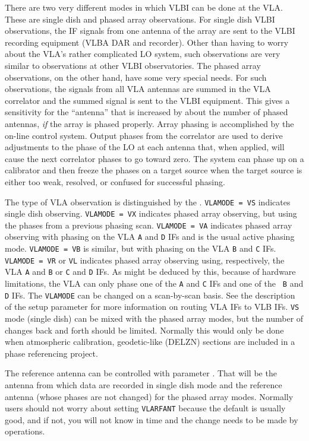 \documentclass{report}
\begin{document}
There are two very different modes in which VLBI can be done at the
VLA.  These are single dish and phased array observations.  For single
dish VLBI observations, the IF signals from one antenna of the array
are sent to the VLBI recording equipment (VLBA DAR and recorder).
Other than having to worry about the VLA's rather complicated LO
system, such observations are very similar to observations at other
VLBI observatories.  The phased array observations, on the other hand,
have some very special needs.  For such observations, the signals from
all VLA antennas are summed in the VLA correlator and the summed
signal is sent to the VLBI equipment.  This gives a sensitivity for
the ``antenna'' that is increased by about the number of phased
antennas, {\em if} the array is phased properly.  Array phasing is
accomplished by the on-line control system.  Output phases from the
correlator are used to derive adjustments to the phase of the LO at
each antenna that, when applied, will cause the next correlator phases
to go toward zero.  The system can phase up on a calibrator and then
freeze the phases on a target source when the target source is either
too weak, resolved, or confused for successful phasing.

The type of VLA observation is distinguished by the .  {\tt VLAMODE = VS} indicates single dish
observing.  {\tt VLAMODE = VX} indicates phased array observing, but
using the phases from a previous phasing scan.  {\tt VLAMODE = VA}
indicates phased array observing with phasing on the VLA {\tt A} and
{\tt D} IFs and is the usual active phasing mode.  {\tt VLAMODE = VB}
is similar, but with phasing on the VLA {\tt B} and {\tt C} IFs.  {\tt
VLAMODE = VR} or {\tt VL} indicates phased array observing using,
respectively, the VLA {\tt A} and {\tt B} or {\tt C} and {\tt D} IFs.
As might be deduced by this, because of hardware limitations, the VLA
can only phase one of the {\tt A} and {\tt C} IFs and one of the {\tt
B} and {\tt D} IFs.  The {\tt VLAMODE} can be changed on a
scan-by-scan basis.  See the description of the setup parameter
 for more information on routing VLA
IFs to VLB IFs.  {\tt VS} mode (single dish) can be mixed with the
phased array modes, but the number of changes back and forth should be
limited.  Normally this would only be done when atmospheric
calibration, geodetic-like (DELZN) sections are included in a phase
referencing project.

The reference antenna can be controlled with parameter .  That will be the antenna from which data are
recorded in single dish mode and the reference antenna (whose phases
are not changed) for the phased array modes.  Normally users should not
worry about setting {\tt VLARFANT} because the default is usually
good, and if not, you will not know in time and the change needs to be
made by operations.
\end{document}
